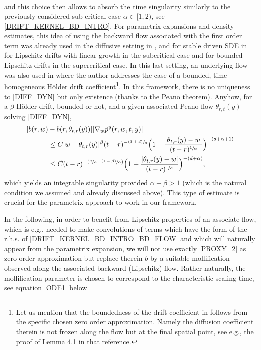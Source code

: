\documentclass[11pt]{article}
\newcommand{\eg}{e.g.,\xspace}
\numberwithin{equation}{section}\providecommand{\asymp}{\mathrel{\sim}}
\newcommand{\psfrac}[2]{\sfrac{(#1)}{#2}}
\theoremstyle{plain}
\theoremstyle{definition}
\newcommand\1{{\mathbf{1}}}
\begin{document}
{\begin{align*}
\end{align*}
and this choice then allows to absorb the time singularity similarly to the previously considered sub-critical case $\alpha\in [1,2) $, see \eqref{DRIFT_KERNEL_BD_INTRO}. For parametrix expansions and density estimates, this idea of using the backward flow associated with the first order term was already used in the diffusive setting in \cite{kona:meno:molc:10}, \cite{dela:meno:10} and for stable driven SDE in~\cite{huan:15} for Lipschitz drifts with linear growth in the subcritical case and \cite{knop:kuli:18} for bounded Lipschitz drifts in the supercritical case. In this last setting, an underlying flow was also used in \cite{kuli:19} where the author addresses the case of a bounded, time-homogeneous Hölder drift coefficient\footnote{Let us mention that the boundedness of the drift coefficient in \cite{kuli:19} follows from the specific chosen zero order approximation. Namely the diffusion coefficient therein is not frozen along the flow but at the final spatial point, see \eg the proof of Lemma 4.1 in that reference.}. In this framework, there is no uniqueness to \eqref{DIFF_DYN} but only existence (thanks to the Peano theorem). Anyhow, for a $\beta$ Hölder drift, bounded or not, and a given associated Peano flow $\theta_{r,t}(y) $ solving \eqref{DIFF_DYN},
\begin{equation}\label{DRIFT_KERNEL_BD_INTRO_BD_FLOW}
\begin{aligned}
|b(r,w)&-b(r,\theta_{t,r}(y))||\nabla_w \tilde p^y(r,w,t,y)|\\
&\le  C |w-\theta_{t,r}(y)|^\beta(t-r)^{-\psfrac{1+d}\alpha}\Bigl(1+\frac{|\theta_{t,r}(y)-w|}{(t-r)^{\sfrac 1\alpha}}\Bigr)^{-(d+\alpha+1)}\\
&\le  \tilde C (t-r)^{-(\sfrac{d}\alpha+\psfrac{1-\beta}{\alpha} )}\Bigl(1+\frac{|\theta_{t,r}(y)-w|}{(t-r)^{\sfrac 1\alpha}}\Bigr)^{-(d+\alpha)},
\end{aligned}
\end{equation}
which yields an integrable singularity provided $\alpha+\beta>1 $ (which is the natural condition we assumed and already discussed above). This type of estimate is crucial for the parametrix approach to work in our framework.}

{In the following, in order to benefit from Lipschitz properties of an associate flow, which is \eg needed to make convolutions of terms which have the form of the r.h.s. of \eqref{DRIFT_KERNEL_BD_INTRO_BD_FLOW} and which will naturally appear from the parametrix expansion, we will not use exactly \eqref{PROXY_2} as zero order approximation but replace therein $b $ by a suitable mollification observed along the associated backward (Lipschitz) flow. Rather naturally, the mollification parameter is chosen to correspond to the characteristic scaling time, see equation \eqref{ODE1} below}
\end{document}
